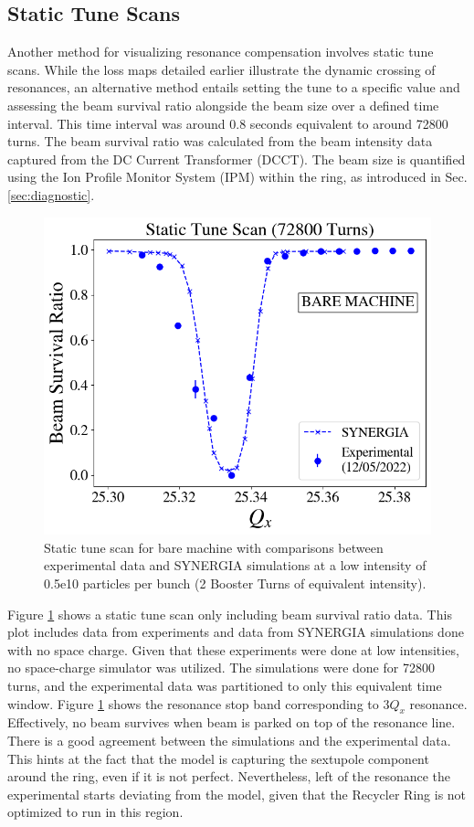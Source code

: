\subsection{Static Tune Scans}

Another method for visualizing resonance compensation involves static tune scans. While the loss maps detailed earlier illustrate the dynamic crossing of resonances, an alternative method entails setting the tune to a specific value and assessing the beam survival ratio alongside the beam size over a defined time interval. This time interval was around 0.8 seconds equivalent to around 72800 turns. The beam survival ratio was calculated from the beam intensity data captured from the DC Current Transformer (DCCT). The beam size is quantified using the Ion Profile Monitor System (IPM) within the ring, as introduced in Sec. \ref{sec:diagnostic}.

\begin{figure}[H]
    \centering
    \includegraphics[width=\columnwidth]{chapter4/static2turns.png}
    \caption{Static tune scan for bare machine with comparisons between experimental data and SYNERGIA simulations at a low intensity of 0.5e10 particles per bunch (2 Booster Turns of equivalent intensity).}
    \label{fig:static2}
\end{figure}

Figure \ref{fig:static2} shows a static tune scan only including beam survival ratio data. This plot includes data from experiments and data from SYNERGIA simulations done with no space charge. Given that these experiments were done at low intensities, no space-charge simulator was utilized. The simulations were done for 72800 turns, and the experimental data was partitioned to only this equivalent time window. Figure \ref{fig:static2} shows the resonance stop band corresponding to $3Q_x$ resonance. Effectively, no beam survives when beam is parked on top of the resonance line. There is a good agreement between the simulations and the experimental data. This hints at the fact that the model is capturing the sextupole component around the ring, even if it is not perfect. Nevertheless, left of the resonance the experimental starts deviating from the model, given that the Recycler Ring is not optimized to run in this region.

